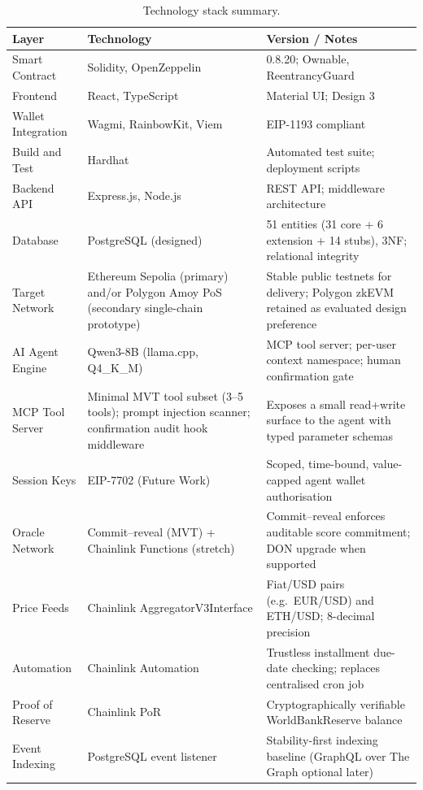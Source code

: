 \documentclass[12pt,a4paper]{report}
\newcommand{\tableheadcolor}{\rowcolor{TableHeadBg}}
\begin{document}
\begin{table}[H]
\centering
\caption[Technology stack summary]{Technology stack summary.}
\label{tab:tech-stack}
\begin{tabular}{p{3cm}p{4cm}p{6.5cm}}
\toprule
\tableheadcolor
\textbf{Layer} & \textbf{Technology} & \textbf{Version / Notes} \\
\midrule
Smart Contract & Solidity, OpenZeppelin & 0.8.20; Ownable, ReentrancyGuard \\
Frontend & React, TypeScript & Material UI; Design 3 \\
Wallet Integration & Wagmi, RainbowKit, Viem & EIP-1193 compliant \\
Build and Test & Hardhat & Automated test suite; deployment scripts \\
Backend API & Express.js, Node.js & REST API; middleware architecture \\
Database & PostgreSQL (designed) & 51 entities (31 core + 6 extension + 14 stubs), 3NF; relational integrity \\
Target Network & Ethereum Sepolia (primary) and/or Polygon Amoy PoS (secondary single-chain prototype) & Stable public testnets for delivery; Polygon zkEVM retained as evaluated design preference \\
AI Agent Engine & Qwen3-8B (llama.cpp, Q4\_K\_M) & MCP tool server; per-user context namespace; human confirmation gate \\
MCP Tool Server & Minimal MVT tool subset (3--5 tools); prompt injection scanner; confirmation audit hook middleware & Exposes a small read+write surface to the agent with typed parameter schemas \\
Session Keys & EIP-7702 (Future Work) & Scoped, time-bound, value-capped agent wallet authorisation \\
Oracle Network & Commit--reveal (MVT) + Chainlink Functions (stretch) & Commit--reveal enforces auditable score commitment; DON upgrade when supported \\
Price Feeds & Chainlink AggregatorV3Interface & Fiat/USD pairs (e.g.\ EUR/USD) and ETH/USD; 8-decimal precision \\
Automation & Chainlink Automation & Trustless installment due-date checking; replaces centralised cron job \\
Proof of Reserve & Chainlink PoR & Cryptographically verifiable WorldBankReserve balance \\
Event Indexing & PostgreSQL event listener & Stability-first indexing baseline (GraphQL over The Graph optional later) \\
\bottomrule
\end{tabular}
\end{table}
\end{document}
